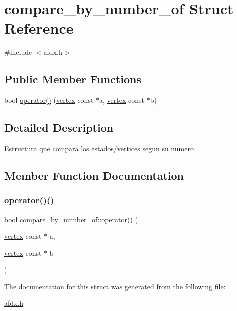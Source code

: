 \hypertarget{structcompare__by__number__of}{}\section{compare\+\_\+by\+\_\+number\+\_\+of Struct Reference}
\label{structcompare__by__number__of}


{\ttfamily \#include $<$afdx.\+h$>$}

\subsection*{Public Member Functions}
\begin{DoxyCompactItemize}
\item 
bool \hyperlink{structcompare__by__number__of_aece99044692df991bf174f5c5176b0d1}{operator()} (\hyperlink{structvertex}{vertex} const $\ast$a, \hyperlink{structvertex}{vertex} const $\ast$b)
\end{DoxyCompactItemize}


\subsection{Detailed Description}
Estructura que compara los estados/vertices segun su numero 

\subsection{Member Function Documentation}
\hypertarget{structcompare__by__number__of_aece99044692df991bf174f5c5176b0d1}{}\label{structcompare__by__number__of_aece99044692df991bf174f5c5176b0d1} 
\subsubsection{\texorpdfstring{operator()()}{operator()()}}
{\footnotesize\ttfamily bool compare\+\_\+by\+\_\+number\+\_\+of\+::operator() (\begin{DoxyParamCaption}\item[{\hyperlink{structvertex}{vertex} const $\ast$}]{a,  }\item[{\hyperlink{structvertex}{vertex} const $\ast$}]{b }\end{DoxyParamCaption})\hspace{0.3cm}{\ttfamily [inline]}}



The documentation for this struct was generated from the following file\+:\begin{DoxyCompactItemize}
\item 
\hyperlink{afdx_8h}{afdx.\+h}\end{DoxyCompactItemize}
